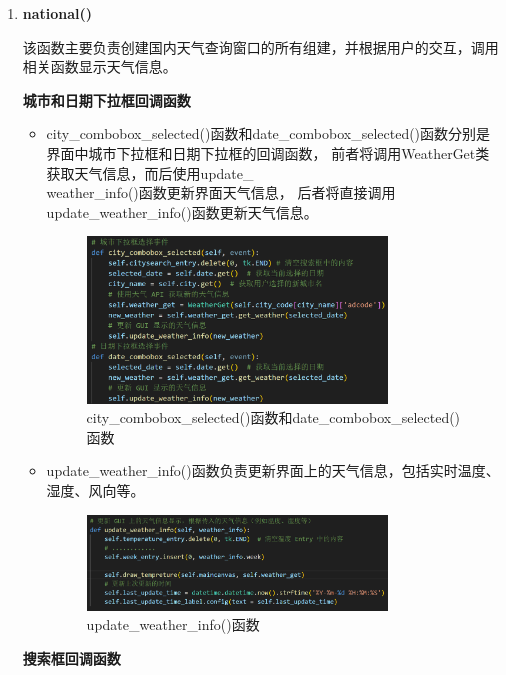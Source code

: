 \documentclass[UTF8]{ctexart}
\begin{document}
\begin{enumerate}
   \item \textbf{national()}

         该函数主要负责创建国内天气查询窗口的所有组建，并根据用户的交互，调用相关函数显示天气信息。

         \textbf{城市和日期下拉框回调函数}
         \begin{itemize}
            \item city\_combobox\_selected()函数和date\_combobox\_selected()函数分别是界面中城市下拉框和日期下拉框的回调函数，
                  前者将调用WeatherGet类获取天气信息，而后使用update\_\\weather\_info()函数更新界面天气信息，
                  后者将直接调用update\_weather\_info()函数更新天气信息。
                  \begin{figure}[H]
                     \centering
                     \includegraphics[width=0.8\textwidth]{pic1.png}
                     \caption{city\_combobox\_selected()函数和date\_combobox\_selected()函数}
                  \end{figure}
            \item update\_weather\_info()函数负责更新界面上的天气信息，包括实时温度、湿度、风向等。
            \begin{figure}[H]
               \centering
               \includegraphics[width=0.8\textwidth]{pic2.png}
               \caption{update\_weather\_info()函数}
            \end{figure}
         \end{itemize}
         \textbf{搜索框回调函数}

\end{enumerate}
\end{document}
